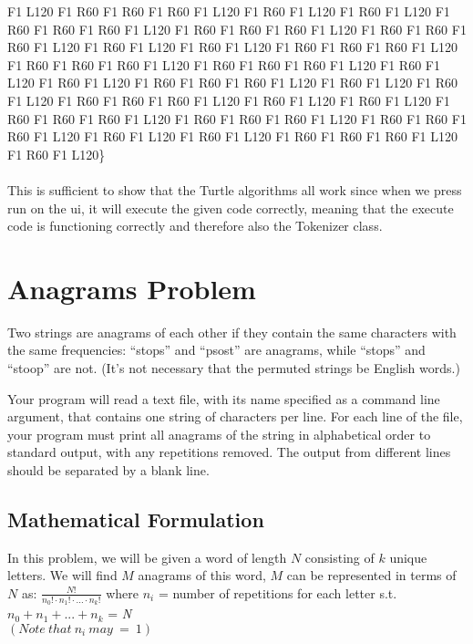 \documentclass[12pt]{article}
\begin{document}
 F1 L120 F1 R60 F1 R60 F1 R60 F1 L120 F1 R60 F1 L120 F1 R60 F1 L120 F1 R60 F1 R60 F1 R60
 F1 L120 F1 R60 F1 R60 F1 R60 F1 L120 F1 R60 F1 R60 F1 R60 F1 L120 F1 R60 F1 L120 F1 R60
 F1 L120 F1 R60 F1 R60 F1 R60 F1 L120 F1 R60 F1 R60 F1 R60 F1 L120 F1 R60 F1 R60 F1 R60 F1
 L120 F1 R60 F1 L120 F1 R60 F1 L120 F1 R60 F1 R60 F1 R60 F1 L120 F1 R60 F1 L120 F1 R60 F1
 L120 F1 R60 F1 R60 F1 R60 F1 L120 F1 R60 F1 L120 F1 R60 F1 L120 F1 R60 F1 R60 F1 R60 F1
 L120 F1 R60 F1 R60 F1 R60 F1 L120 F1 R60 F1 R60 F1 R60 F1 L120 F1 R60 F1 L120 F1 R60 F1
 L120 F1 R60 F1 R60 F1 R60 F1 L120 F1 R60 F1 L120\}
 \\ \\
 This is sufficient to show that the Turtle algorithms all work since when we press run
 on the ui, it will execute the given code correctly, meaning that the execute code is
 functioning correctly and therefore also the Tokenizer class.


\newpage

\section{Anagrams Problem}
Two strings are anagrams of each other if they contain the same characters with the
same frequencies: “stops” and “psost” are anagrams, while “stops” and “stoop”
are not. (It’s not necessary that the permuted strings be English words.)

Your program will read a text file, with its name specified as a command line argument,
that contains one string of characters per line. For each line of the file, your program must
print all anagrams of the string in alphabetical order to standard output, with any repetitions
removed. The output from different lines should be separated by a blank line.


\bigskip


\bigskip

\noindent


\newpage


\subsection{Mathematical Formulation}
In this problem, we will be given a word of length $N$ consisting of $k$ unique letters.
We will find $M$ anagrams of this word, $M$ can be represented in terms of $N$ as:
  $\frac{N!}{n_0!\cdot n_1!\cdot ...\cdot n_k!}$ where $n_i$ = number of repetitions
  for each letter s.t. $n_0+n_1+...+n_k$ = {\em N} \\ $(Note\ that\ n_i\ may\ =\ 1)$
\end{document}
